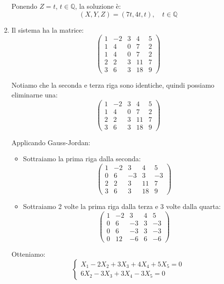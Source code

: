 \documentclass{article}
\theoremstyle{plain}
\theoremstyle{definition}
\theoremstyle{remark}
\begin{document}
\begin{enumerate}
    Ponendo $Z = t$, $t \in \mathbb{Q}$, la soluzione è:
    \[\boxed{(X,Y,Z) = (7t, 4t, t),\quad t \in \mathbb{Q}}\]
    \item Il sistema ha la matrice:
    \[
    \begin{pmatrix}
    1 & -2 & 3 & 4 & 5 \\
    1 & 4 & 0 & 7 & 2 \\
    1 & 4 & 0 & 7 & 2 \\
    2 & 2 & 3 & 11 & 7 \\
    3 & 6 & 3 & 18 & 9 
    \end{pmatrix}
    \]
    
    Notiamo che la seconda e terza riga sono identiche, quindi possiamo eliminarne una:
    \[
    \begin{pmatrix}
    1 & -2 & 3 & 4 & 5 \\
    1 & 4 & 0 & 7 & 2 \\
    2 & 2 & 3 & 11 & 7 \\
    3 & 6 & 3 & 18 & 9 
    \end{pmatrix}
    \]
    
    Applicando Gauss-Jordan:
    \begin{itemize}
        \item Sottraiamo la prima riga dalla seconda:
        \[
        \begin{pmatrix}
        1 & -2 & 3 & 4 & 5 \\
        0 & 6 & -3 & 3 & -3 \\
        2 & 2 & 3 & 11 & 7 \\
        3 & 6 & 3 & 18 & 9 
        \end{pmatrix}
        \]
        
        \item Sottraiamo 2 volte la prima riga dalla terza e 3 volte dalla quarta:
        \[
        \begin{pmatrix}
        1 & -2 & 3 & 4 & 5 \\
        0 & 6 & -3 & 3 & -3 \\
        0 & 6 & -3 & 3 & -3 \\
        0 & 12 & -6 & 6 & -6
        \end{pmatrix}
        \]
    \end{itemize}
    
    Otteniamo:
    \[
    \begin{cases}
    X_1 - 2X_2 + 3X_3 + 4X_4 + 5X_5 = 0 \\
    6X_2 - 3X_3 + 3X_4 - 3X_5 = 0
    \end{cases}
    \]
    

\end{enumerate}
\end{document}
